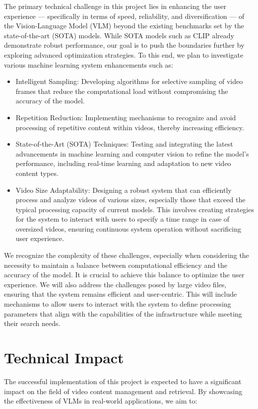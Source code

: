 \documentclass[11pt]{article}
\begin{document}
 The primary technical challenge in this project lies in enhancing the user experience — specifically in terms of speed, reliability, and diversification — of the Vision-Language Model (VLM) beyond the existing benchmarks set by the state-of-the-art (SOTA) models. While SOTA models such as CLIP already demonstrate robust performance, our goal is to push the boundaries further by exploring advanced optimization strategies. To this end, we plan to investigate various machine learning system enhancements such as:
 
 \begin{itemize}
     \item Intelligent Sampling: Developing algorithms for selective sampling of video frames that reduce the computational load without compromising the accuracy of the model.
     \item Repetition Reduction: Implementing mechanisms to recognize and avoid processing of repetitive content within videos, thereby increasing efficiency.
     \item State-of-the-Art (SOTA) Techniques: Testing and integrating the latest advancements in machine learning and computer vision to refine the model's performance, including real-time learning and adaptation to new video content types.
     \item Video Size Adaptability: Designing a robust system that can efficiently process and analyze videos of various sizes, especially those that exceed the typical processing capacity of current models. This involves creating strategies for the system to interact with users to specify a time range in case of oversized videos, ensuring continuous system operation without sacrificing user experience.
 \end{itemize}
 
 We recognize the complexity of these challenges, especially when considering the necessity to maintain a balance between computational efficiency and the accuracy of the model. It is crucial to achieve this balance to optimize the user experience. We will also address the challenges posed by large video files, ensuring that the system remains efficient and user-centric. This will include mechanisms to allow users to interact with the system to define processing parameters that align with the capabilities of the infrastructure while meeting their search needs. 

\section{Technical Impact}
The successful implementation of this project is expected to have a significant impact on the field of video content management and retrieval. By showcasing the effectiveness of VLMs in real-world applications, we aim to:
\end{document}
